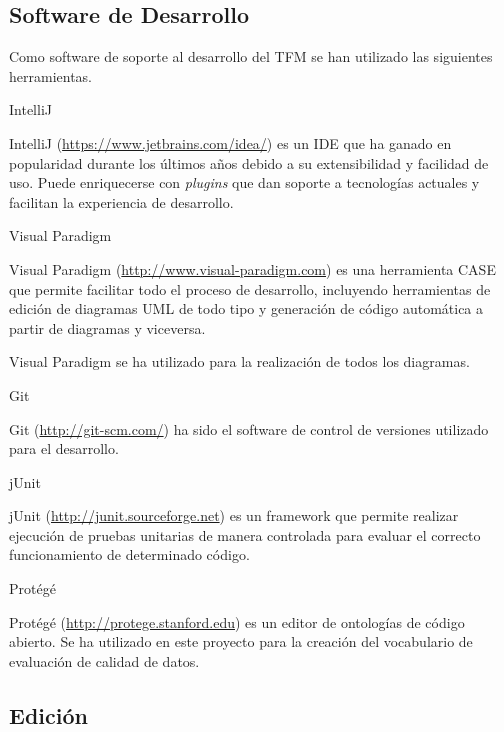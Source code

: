 \subsection{Software de Desarrollo}

Como software de soporte al desarrollo del \acs{TFM} se han utilizado las
siguientes herramientas. 

\begin{definitionlist} 
\item[IntelliJ]

  IntelliJ (\url{https://www.jetbrains.com/idea/}) es un \acf{IDE} que ha ganado
  en popularidad durante los últimos años debido a su extensibilidad y facilidad
  de uso. Puede enriquecerse con \textit{plugins} que dan soporte a tecnologías
  actuales y facilitan la experiencia de desarrollo. 


\item[Visual Paradigm]

  Visual Paradigm (\url{http://www.visual-paradigm.com}) es una herramienta
  \acf{CASE} que permite facilitar todo el proceso de desarrollo, incluyendo
  herramientas de edición de diagramas \acs{UML} de todo tipo y generación de
  código automática a partir de diagramas y viceversa. 

  Visual Paradigm se ha utilizado para la realización de todos los diagramas. 

\item[Git]

  
  Git (\url{http://git-scm.com/}) ha sido el software de control de versiones
  utilizado para el desarrollo. 

\item[jUnit]

  jUnit (\url{http://junit.sourceforge.net}) es un framework que permite realizar
  ejecución de pruebas unitarias de manera controlada para evaluar el correcto
  funcionamiento de determinado código. 

\item[Protégé]

  Protégé (\url{http://protege.stanford.edu}) es un editor de ontologías de código
  abierto. Se ha utilizado en este proyecto para la creación del vocabulario de
  evaluación de calidad de datos. 

\end{definitionlist}


\subsection{Edición}

